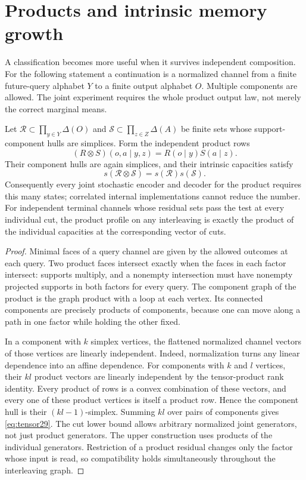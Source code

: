 \section{Products and intrinsic memory growth}
\label{sec:tensor29}
A classification becomes more useful when it survives independent
composition. For the following statement a continuation is a normalized
channel from a finite future-query alphabet $Y$ to a finite output
alphabet $O$. Multiple components are allowed. The joint experiment
requires the whole product output law, not merely the correct marginal
means.

\begin{theorem}
\label{thm:tensor29}
Let $\mathscr R\subset\prod_{y\in Y}\Delta(O)$ and
$\mathscr S\subset\prod_{z\in Z}\Delta(A)$ be finite sets whose
support-component hulls are simplices. Form the independent product
rows
\[
 (R\otimes S)(o,a\mid y,z)=R(o\mid y)S(a\mid z).
\]
Their component hulls are again simplices, and their intrinsic capacities
satisfy
\begin{equation}\label{eq:tensor29}
                     s(\mathscr R\otimes\mathscr S)
                           =s(\mathscr R)s(\mathscr S).
\end{equation}
Consequently every joint stochastic encoder and decoder for the product
requires this many states; correlated internal implementations cannot
reduce the number. For independent terminal channels whose residual
sets pass the test at every individual cut, the product profile on
any interleaving is exactly the product of the individual capacities
at the corresponding vector of cuts.
\end{theorem}
\begin{proof}
Minimal faces of a query channel are given by the allowed outcomes at
each query. Two product faces intersect exactly when the faces in each
factor intersect: supports multiply, and a nonempty intersection must
have nonempty projected supports in both factors for every query.
The component graph of the product is the graph product with a loop
at each vertex. Its connected components are precisely products of
components, because one can move along a path in one factor while
holding the other fixed.

In a component with $k$ simplex vertices, the flattened normalized
channel vectors of those vertices are linearly independent. Indeed,
normalization turns any linear dependence into an affine dependence.
For components with $k$ and $l$ vertices, their $kl$ product vectors
are linearly independent by the tensor-product rank identity. Every
product of rows is a convex combination of these vectors, and every
one of these product vertices is itself a product row. Hence the
component hull is their $(kl-1)$-simplex. Summing $kl$ over pairs of
components gives \eqref{eq:tensor29}. The cut lower bound allows
arbitrary normalized joint generators, not just product generators.
The upper construction uses products of the individual generators.
Restriction of a product residual changes only the factor whose input
is read, so compatibility holds simultaneously throughout the
interleaving graph.
\end{proof}


